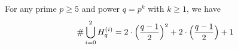 \documentclass[10pt,a4paper]{amsart}
\begin{document}
\begin{lemma}
\label{lem-count}
For any prime $p \geq 5$ and power $q=p^k$ with $k\geq 1$, 
we have 
\begin{align*}
    \#\bigcup_{i=0}^{2} H_q^{(i)}=2\cdot \Bigl(\frac{q-1}{2} \Bigr)^2+2\cdot \Big(\frac{q-1}{2} \Big)+ 1
\end{align*}
    
\end{lemma}
\end{document}

